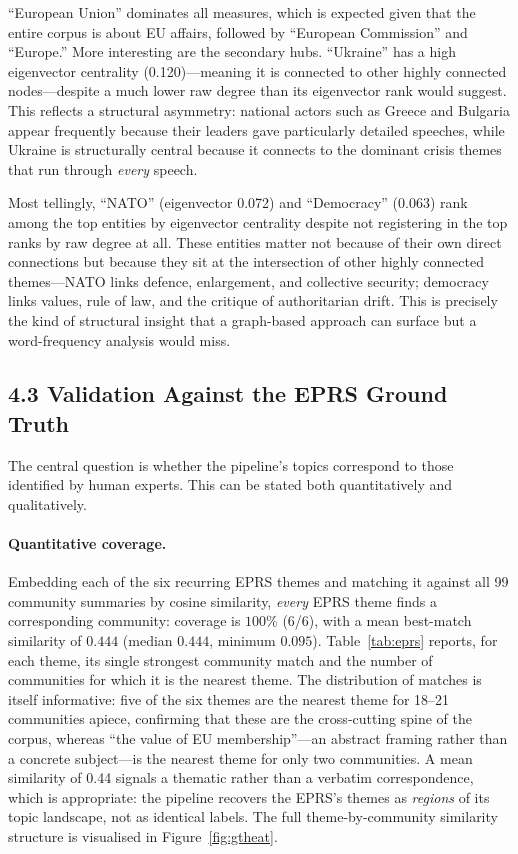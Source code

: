 \documentclass[11pt]{article}
\begin{document}
``European Union'' dominates all measures, which is expected given that the entire corpus is about EU affairs, followed by ``European Commission'' and ``Europe.'' More interesting are the secondary hubs. ``Ukraine'' has a high eigenvector centrality (0.120)---meaning it is connected to other highly connected nodes---despite a much lower raw degree than its eigenvector rank would suggest. This reflects a structural asymmetry: national actors such as Greece and Bulgaria appear frequently because their leaders gave particularly detailed speeches, while Ukraine is structurally central because it connects to the dominant crisis themes that run through \emph{every} speech.

Most tellingly, ``NATO'' (eigenvector 0.072) and ``Democracy'' (0.063) rank among the top entities by eigenvector centrality despite not registering in the top ranks by raw degree at all. These entities matter not because of their own direct connections but because they sit at the intersection of other highly connected themes---NATO links defence, enlargement, and collective security; democracy links values, rule of law, and the critique of authoritarian drift. This is precisely the kind of structural insight that a graph-based approach can surface but a word-frequency analysis would miss.

\subsection{4.3 Validation Against the EPRS Ground Truth}

The central question is whether the pipeline's topics correspond to those identified by human experts. This can be stated both quantitatively and qualitatively.

\paragraph{Quantitative coverage.}
Embedding each of the six recurring EPRS themes and matching it against all 99 community summaries by cosine similarity, \emph{every} EPRS theme finds a corresponding community: coverage is $100\%$ (6/6), with a mean best-match similarity of $0.444$ (median $0.444$, minimum $0.095$). Table~\ref{tab:eprs} reports, for each theme, its single strongest community match and the number of communities for which it is the nearest theme. The distribution of matches is itself informative: five of the six themes are the nearest theme for 18--21 communities apiece, confirming that these are the cross-cutting spine of the corpus, whereas ``the value of EU membership''---an abstract framing rather than a concrete subject---is the nearest theme for only two communities. A mean similarity of 0.44 signals a thematic rather than a verbatim correspondence, which is appropriate: the pipeline recovers the EPRS's themes as \emph{regions} of its topic landscape, not as identical labels. The full theme-by-community similarity structure is visualised in Figure~\ref{fig:gtheat}.
\end{document}
